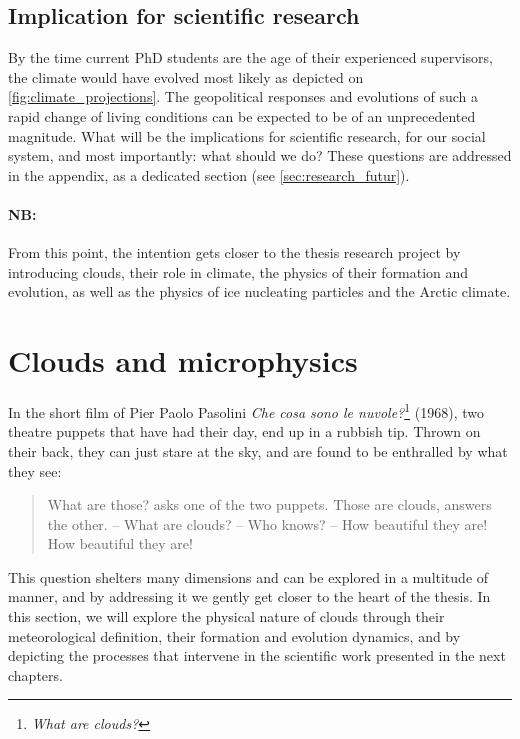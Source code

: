 \subsection{Implication for scientific research}
\label{sec:implication_sciences}
By the time current PhD students  are the age of their experienced supervisors, the climate would have evolved most likely as depicted on \cref{fig:climate_projections}. The geopolitical responses and evolutions of such a rapid change of living conditions can be expected to be of an unprecedented magnitude.
What will be the implications for scientific research, for our social system, and most importantly: what should we do? These questions are addressed in the appendix, as a dedicated section (see \cref{sec:research_futur}).


\vspace{\baselineskip}
\paragraph{NB:} From this point, the intention gets closer to the thesis research project by introducing clouds, their role in climate, the physics of their formation and evolution, as well as the physics of ice nucleating particles and the Arctic climate.

\section{Clouds and microphysics}
In the short film of Pier Paolo Pasolini \textit{Che cosa sono le nuvole?}\footnote{\textit{What are clouds?}} (1968), two theatre puppets that have had their day, end up in a rubbish tip. Thrown on their back, they can just stare at the sky, and are found to be enthralled by what they see:

\begin{quote}
    What are those? asks one of the two puppets. Those are clouds, answers the other. \--- What are clouds? \--- Who knows? \--- How beautiful they are! How beautiful they are!
\end{quote}

This question shelters many dimensions and can be explored in a multitude of manner, and by addressing it we gently get closer to the heart of the thesis.
In this section, we will explore the physical nature of clouds through their meteorological definition, their formation and evolution dynamics, and by depicting the processes that intervene in the scientific work presented in the next chapters. 

